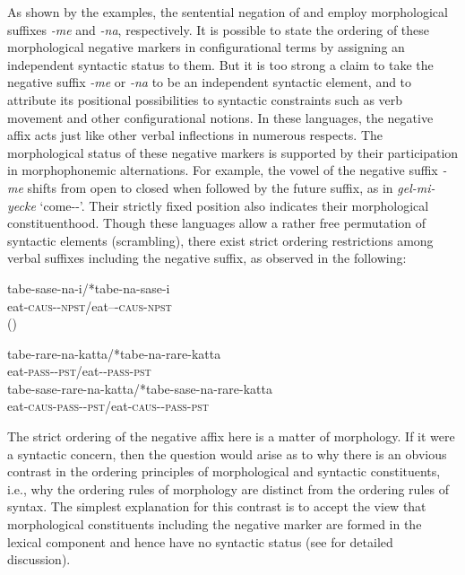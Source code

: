 \documentclass[output=paper
 	        ,biblatex
                ,babelshorthands
                ,newtxmath
                ,draftmode
                ,colorlinks, citecolor=brown
]{langscibook}
\begin{document}
\begin{exe}
\begin{xlist}
\begin{exe}
\begin{xlist}
\noindent
As shown by the examples, the sentential negation of  and  employ
morphological suffixes \textit{-me} and \textit{-na}, respectively.  It is possible to state the
ordering of these morphological negative markers in configurational terms by assigning an
independent syntactic status to them.  But it is too strong a claim to take the negative suffix
\textit{-me} or \textit{-na} to be an independent syntactic element, and to attribute its positional
possibilities to syntactic constraints such as verb movement and other configurational notions.  In
these languages, the negative affix acts just like other verbal inflections in numerous respects.
The morphological status of these negative markers is supported by their participation in
morphophonemic alternations.  For example, the vowel of the  negative suffix
\textit{-me} shifts from open to closed when followed by the future suffix, as in
\textit{gel-mi-yecke} `come-\NEG-\FUT'.  Their strictly fixed position also indicates their
morphological constituenthood. Though these languages allow a rather free permutation of syntactic
elements (scrambling), there exist strict ordering restrictions among verbal suffixes including the
negative suffix, as observed in the following:

\eal
\ex
\gll tabe-sase-na-i/*tabe-na-sase-i \\
     eat-\textsc{caus}-\NEG-\textsc{npst}/eat--\NEG-\textsc{caus}-\textsc{npst} \\\hfill()

\ex
\gll tabe-rare-na-katta/*tabe-na-rare-katta \\
     eat-\textsc{pass}-\NEG-\textsc{pst}/eat-\NEG-\textsc{pass}-\textsc{pst} \\

\ex
\gll tabe-sase-rare-na-katta/*tabe-sase-na-rare-katta \\
     eat-\textsc{caus}-\textsc{pass}-\NEG-\textsc{pst}/eat-\textsc{caus}-\NEG-\textsc{pass}-\textsc{pst}\\
\zl

\noindent
The strict ordering of the negative affix here is a matter of morphology.
If it were a syntactic concern, then
the question would arise as to why
there is an obvious contrast in the ordering principles
of morphological and syntactic constituents, i.e., why the ordering
rules of morphology are distinct from the ordering rules of syntax. The
simplest explanation for this contrast is to accept
the view that morphological constituents including the negative marker
are formed in the lexical component and hence have no syntactic
status (see \citealt[Chapter~2]{Kim:00} for detailed discussion).


\end{xlist}
\end{exe}
\end{xlist}
\end{exe}
\end{document}

